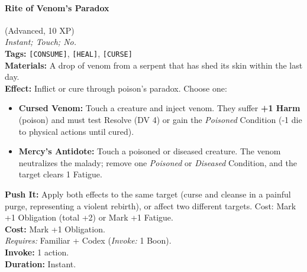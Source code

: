 \paragraph{Rite of Venom's Paradox} (Advanced, 10 XP) \hfill \\
\emph{Instant; Touch; No.} \\
\textbf{Tags:} \texttt{[CONSUME]}, \texttt{[HEAL]}, \texttt{[CURSE]} \\
\textbf{Materials:} A drop of venom from a serpent that has shed its skin within the last day. \\
\textbf{Effect:} Inflict or cure through poison's paradox. Choose one:
\begin{itemize}
  \item \textbf{Cursed Venom:} Touch a creature and inject venom. They suffer \textbf{+1 Harm} (poison) and must test Resolve (DV 4) or gain the \textit{Poisoned} Condition (-1 die to physical actions until cured).
  \item \textbf{Mercy's Antidote:} Touch a poisoned or diseased creature. The venom neutralizes the malady; remove one \textit{Poisoned} or \textit{Diseased} Condition, and the target clears 1 Fatigue.
\end{itemize}
\textbf{Push It:} Apply both effects to the same target (curse and cleanse in a painful purge, representing a violent rebirth), or affect two different targets. Cost: Mark +1 Obligation (total +2) or Mark +1 Fatigue. \\
\textbf{Cost:} Mark +1 Obligation. \\
\textit{Requires:} Familiar + Codex (\textit{Invoke:} 1 Boon). \\
\textbf{Invoke:} 1 action. \\
\textbf{Duration:} Instant.


